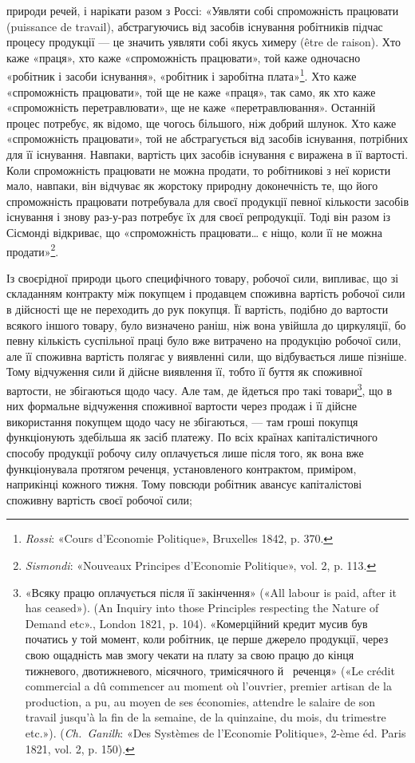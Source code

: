\parcont{}  %
природи речей, і нарікати разом з Россі: «Уявляти собі спроможність
працювати (puissance de travail), абстрагуючись від засобів
існування робітників підчас процесу продукції — це значить
уявляти собі якусь химеру (être de raison). Хто каже «праця»,
хто каже «спроможність працювати», той каже одночасно «робітник
і засоби існування», «робітник і заробітна плата»\footnote{
\emph{Rossi}: «Cours d’Economie Politique», Bruxelles 1842, p. 370.
}. Хто каже «спроможність працювати», той ще не каже «праця», так
само, як хто каже «спроможність перетравлювати», ще не каже
«перетравлювання». Останній процес потребує, як відомо, ще
чогось більшого, ніж добрий шлунок. Хто каже «спроможність
працювати», той не абстрагується від засобів існування, потрібних
для її існування. Навпаки, вартість цих засобів існування
є виражена в її вартості. Коли спроможність працювати не можна
продати, то робітникові з неї користи мало, навпаки, він відчуває
як жорстоку природну доконечність те, що його спроможність
працювати потребувала для своєї продукції певної кількости засобів
існування і знову раз-у-раз потребує їх для своєї репродукції.
Тоді він разом із Сісмонді відкриває, що «спроможність
працювати\dots{} є ніщо, коли її не можна продати»\footnote{
\emph{Sismondi}: «Nouveaux Principes d’Economie Politique», vol. 2, p. 113.
}.

Із своєрідної природи цього специфічного товару, робочої
сили, випливає, що зі складанням контракту між покупцем і
продавцем споживна вартість робочої сили в дійсності ще не
переходить до рук покупця. Її вартість, подібно до вартости
всякого іншого товару, було визначено раніш, ніж вона увійшла
до циркуляції, бо певну кількість суспільної праці було вже
витрачено на продукцію робочої сили, але її споживна вартість
полягає у виявленні сили, що відбувається лише пізніше. Тому
відчуження сили й дійсне виявлення її, тобто її буття як споживної
вартости, не збігаються щодо часу. Але там, де йдеться
про такі товари\footnote{
«Всяку працю оплачується після її закінчення» («All labour is
paid, after it has ceased»). (An Inquiry into those Principles respecting
the Nature of Demand etc»., London 1821, p. 104). «Комерційний кредит
мусив був початись у той момент, коли робітник, це перше джерело продукції,
через свою ощадність мав змогу чекати на плату за свою працю
до кінця тижневого, двотижневого, місячного, тримісячного й~ реченця»
(«Le crédit commercial a dû commencer au moment où l’ouvrier,
premier artisan de la production, a pu, au moyen de ses économies, attendre
le salaire de son travail jusqu’à la fin de la semaine, de la quinzaine, du
mois, du trimestre etc.»). (\emph{Ch.~Ganilh}: «Des Systèmes de l’Economie
Politique», 2-ème éd. Paris 1821, vol. 2, p. 150).
}, що в них формальне відчуження споживної
вартости через продаж і її дійсне використання покупцем щодо
часу не збігаються, — там гроші покупця функціонують здебільша
як засіб платежу. По всіх країнах капіталістичного способу
продукції робочу силу оплачується лише після того, як вона
вже функціонувала протягом реченця, установленого контрактом,
приміром, наприкінці кожного тижня. Тому повсюди робітник
авансує капіталістові споживну вартість своєї робочої сили;
\parbreak{}  %
